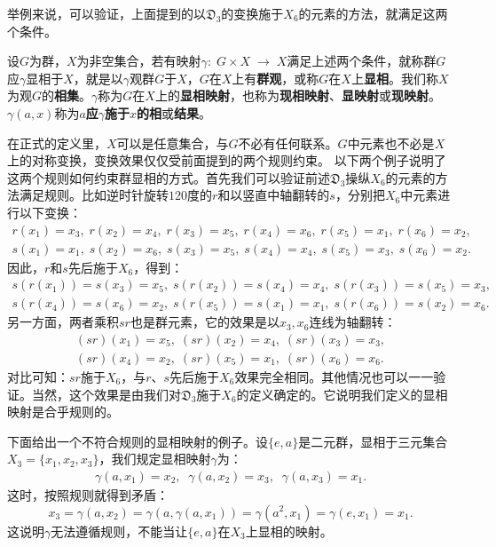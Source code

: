\documentclass[12pt,UTF8,fontset=none]{ctexbook}
\begin{document}
举例来说，可以验证，上面提到的以$\mathfrak{D}_3$的变换施于$X_6$的元素的方法，就满足这两个条件。

\begin{df}
    设$G$为群，$X$为非空集合，若有映射$\gamma:\; G\times X\;\longrightarrow \; X$满足上述两个条件，就称群$G$应$\gamma$显相于$X$，就是以$\gamma$观群$G$于$X$，$G$在$X$上有\textbf{群观}，或称$G$在$X$上\textbf{显相}。我们称$X$为观$G$的\textbf{相集}。$\gamma$称为$G$在$X$上的\textbf{显相映射}，也称为\textbf{现相映射}、\textbf{显映射}或\textbf{现映射}。$\gamma(a,x)$称为$a$\textbf{应}$\gamma$\textbf{施于}$x$\textbf{的相}或\textbf{结果}。
\end{df}
在正式的定义里，$X$可以是任意集合，与$G$不必有任何联系。$G$中元素也不必是$X$上的对称变换，变换效果仅仅受前面提到的两个规则约束。
以下两个例子说明了这两个规则如何约束群显相的方式。首先我们可以验证前述$\mathfrak{D}_3$操纵$X_6$的元素的方法满足规则。比如逆时针旋转$120$度的$r$和以竖直中轴翻转的$s$，分别把$X_6$中元素进行以下变换：
\begin{align*}
    r(x_1)=x_3,\;r(x_2)=x_4,\;r(x_3)=x_5,\;r(x_4)=x_6,\;r(x_5)=x_1,\;r(x_6)=x_2,\\
    s(x_1)=x_1,\;s(x_2)=x_6,\;s(x_3)=x_5,\;s(x_4)=x_4,\;s(x_5)=x_3,\;s(x_6)=x_2.
\end{align*}
因此，$r$和$s$先后施于$X_6$，得到：
\begin{align*}
    s(r(x_1))=s(x_3)=x_5,\;s(r(x_2))=s(x_4)=x_4,\;s(r(x_3))=s(x_5)=x_3,\\
    s(r(x_4))=s(x_6)=x_2,\;s(r(x_5))=s(x_1)=x_1,\;s(r(x_6))=s(x_2)=x_6.
\end{align*}
另一方面，两者乘积$sr$也是群元素，它的效果是以$x_3,x_6$连线为轴翻转：
\begin{align*}
    (sr)(x_1)=x_5,\;(sr)(x_2)=x_4,\;(sr)(x_3)=x_3,\\
    (sr)(x_4)=x_2,\;(sr)(x_5)=x_1,\;(sr)(x_6)=x_6.
\end{align*}
对比可知：$sr$施于$X_6$，与$r$、$s$先后施于$X_6$效果完全相同。其他情况也可以一一验证。当然，这个效果是由我们对$\mathfrak{D}_3$施于$X_6$的定义确定的。它说明我们定义的显相映射是合乎规则的。

下面给出一个不符合规则的显相映射的例子。设$\{e,a\}$是二元群，显相于三元集合$X_3=\{x_1,x_2,x_3\}$，我们规定显相映射$\gamma$为：
\begin{align*}
    \gamma(a,x_1) = x_2,\;\;\gamma(a,x_2) = x_3,\;\;\gamma(a,x_3) = x_1.
\end{align*}
这时，按照规则就得到矛盾：
\[
  x_3 = \gamma(a,x_2) = \gamma(a,\gamma(a,x_1)) = \gamma(a^2,x_1) = \gamma(e,x_1) = x_1.
\]
这说明$\gamma$无法遵循规则，不能当让$\{e,a\}$在$X_3$上显相的映射。
\end{document}
